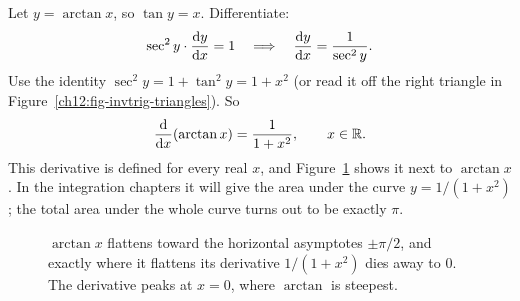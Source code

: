 Let $y=\arctan x$, so $\tan y = x$. Differentiate:
\[
   \sec^2 y\cdot\frac{\mathrm{d} y}{\mathrm{d} x} = 1
   \quad\Longrightarrow\quad
   \frac{\mathrm{d} y}{\mathrm{d} x} = \frac{1}{\sec^2 y}.
\]
Use the identity $\sec^2 y = 1 + \tan^2 y = 1 + x^2$ (or read it off the right
triangle in Figure~\ref{ch12:fig-invtrig-triangles}). So
\[
   \frac{\mathrm{d}}{\mathrm{d} x}\!\left(\arctan x\right) = \frac{1}{1+x^2},\qquad x\in\mathbb{R}.
\]
This derivative is defined for every real $x$, and Figure~\ref{ch12:fig-arctan}
shows it next to $\arctan x$. In the integration chapters it will give the
area under the curve $y = 1/(1+x^2)$; the total area under the whole curve
turns out to be exactly $\pi$.

\begin{figure}[H]
\centering
{}
\caption{$\arctan x$ flattens toward the horizontal asymptotes
$\pm\pi/2$, and exactly where it flattens its derivative $1/(1+x^2)$ dies
away to $0$. The derivative peaks at $x=0$, where $\arctan$ is steepest.}
\label{ch12:fig-arctan}
\end{figure}

